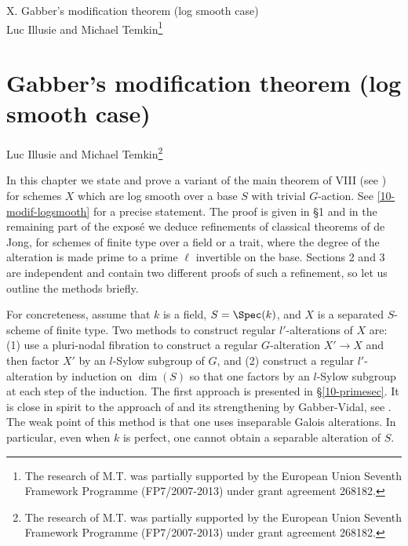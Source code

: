 \documentclass[10pt]{../fichiers-configuration-latex/smfart}
\begin{document}
\begin{center}
X. Gabber's modification theorem (log smooth case)\\
Luc Illusie and Michael Temkin\footnote{The research of M.T. was partially supported by the
European Union Seventh Framework Programme
(FP7/2007-2013) under grant agreement 268182.}
\end{center}

\tableofcontents

\else
{}
\chapter{Gabber's modification theorem (log smooth case)}
\begin{center}
Luc Illusie and Michael Temkin\footnote{The research of M.T. was partially supported by the
European Union Seventh Framework Programme
(FP7/2007-2013) under grant agreement 268182.}
\end{center}
\fi

In this chapter we state and prove a variant of the main theorem of VIII
(see ) for schemes $X$ which are log smooth
over a base $S$ with trivial $G$-action. See \ref{10-modif-logsmooth} for
a precise statement. The proof is given in §1 and in the remaining part
of the exposé we deduce refinements of classical theorems of de Jong,
for schemes of finite type over a field or a trait, where the degree of
the alteration is made prime to a prime $\ell$ invertible on the base.
Sections 2 and 3 are independent and contain two different proofs of
such a refinement, so let us outline the methods briefly.

For concreteness, assume that $k$ is a field, $S=\Spec(k)$, and $X$ is a
separated $S$-scheme of finite type. Two methods to construct regular
$l'$-alterations of $X$ are: (1) use a pluri-nodal fibration to construct
a regular $G$-alteration $X'\to X$ and then factor $X'$ by an $l$-Sylow
subgroup of $G$, and (2) construct a regular $l'$-alteration by induction
on $\dim(S)$ so that one factors by an $l$-Sylow subgroup at each step of
the induction. The first approach is presented in \S\ref{10-primesec}.
It is close in spirit to the approach of \cite{Families@de_Jong} and its
strengthening by Gabber-Vidal, see \cite[\S4]{Brauer@Vidal}. The weak point
of this method is that one uses inseparable Galois alterations. In particular,
even when $k$ is perfect, one cannot obtain a separable alteration of $S$.
\end{document}
